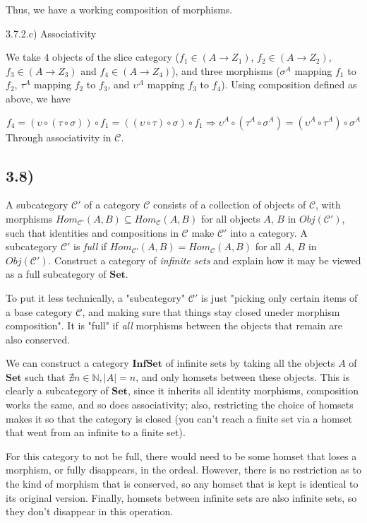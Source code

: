 \documentclass[12pt, letterpaper, twoside]{report}
\begin{document}
Thus, we have a working composition of morphisms.

3.7.2.c) Associativity

We take 4 objects of the slice category ($f_1 \in (A \to Z_1)$, $f_2 \in (A \to Z_2)$, $f_3 \in (A \to Z_3)$ and  $f_4 \in (A \to Z_4)$), and three morphisms ($\sigma^A$ mapping $f_1$ to $f_2$, $\tau^A$ mapping $f_2$ to $f_3$, and $\upsilon^A$ mapping $f_3$ to $f_4$). Using composition defined as above, we have

$$
f_4 = ( \upsilon \circ (\tau  \circ \sigma)) \circ f_1
	= ((\upsilon \circ  \tau) \circ \sigma ) \circ f_1
\Rightarrow
   \upsilon^A \circ (\tau^A  \circ \sigma^A)
= (\upsilon^A \circ  \tau^A) \circ \sigma^A
$$
Through associativity in $\mathcal{C}$.


\subsection*{3.8)}

A subcategory $\mathcal{C'}$ of a category $\mathcal{C}$ consists of a collection of objects of $\mathcal{C}$, with morphisms $Hom_\mathcal{C'} (A, B) \subseteq Hom_\mathcal{C} (A, B)$ for all objects $A$, $B$ in $Obj(\mathcal{C'})$, such that identities and compositions in $\mathcal{C}$ make $\mathcal{C'}$ into a category. A subcategory $\mathcal{C'}$ is \textit{full} if $Hom_\mathcal{C'} (A, B) = Hom_\mathcal{C} (A, B)$ for all $A$, $B$ in $Obj(\mathcal{C'})$. Construct a category of \textit{infinite sets} and explain how it may be viewed as a full subcategory of $\mathbf{Set}$.

To put it less technically, a "subcategory" $\mathcal{C'}$ is just "picking only certain items of a base category $\mathcal{C}$, and making sure that things stay closed uneder morphism composition". It is "full" if \textit{all} morphisms between the objects that remain are also conserved.

We can construct a category $\mathbf{InfSet}$ of infinite sets by taking all the objects $A$ of $\mathbf{Set}$ such that $\nexists n \in \mathbb{N}, |A| = n$, and only homsets between these objects. This is clearly a subcategory of $\mathbf{Set}$, since it inherits all identity morphisms, composition works the same, and so does associativity; also, restricting the choice of homsets makes it so that the category is closed (you can't reach a finite set via a homset that went from an infinite to a finite set).

For this category to not be full, there would need to be some homset that loses a morphism, or fully disappears, in the ordeal. However, there is no restriction as to the kind of morphism that is conserved, so any homset that is kept is identical to its original version. Finally, homsets between infinite sets are also infinite sets, so they don't disappear in this operation.
\end{document}
